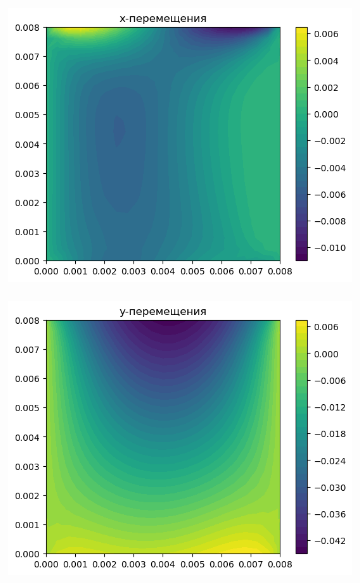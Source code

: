 \documentclass[12pt, a4paper]{article}
\begin{document}
	\begin{figure}[H]
	\centering
	\begin{subfigure}[H]{0.4\textwidth}
		\includegraphics[width=\textwidth]{x0}
	\end{subfigure}
	\qquad\qquad
	\begin{subfigure}[H]{0.4\textwidth}
		\includegraphics[width=\textwidth]{y0}
	\end{subfigure}	
	\\[0.2cm]
	\caption{Перемещения}
	\begin{subfigure}[H]{0.4\textwidth}

\end{subfigure}
\end{figure}
\end{document}
